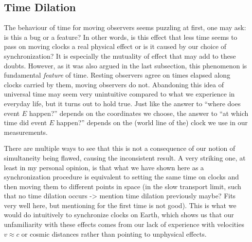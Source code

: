 


		\subsection{Time Dilation}
The behaviour of time for moving observers seems puzzling at first, one may ask: is this a bug or a feature? In other words, is this effect that less time seems to pass on moving clocks a real physical effect or is it caused by our choice of synchronization? It is especially the mutuality of effect that may add to these doubts. However, as it was also argued in the last subsection, this phenomenon is fundamental \emph{feature} of time. Resting observers agree on times elapsed along clocks carried by them, moving observers do not. Abandoning this idea of universal time may seem very unintuitive compared to what we experience in everyday life, but it turns out to hold true. Just like the answer to \enquote{where does event $E$ happen?} depends on the coordinates we choose, the answer to \enquote{at which time did event $E$ happen?} depends on the (world line of the) clock we use in our measurements.

There are multiple ways to see that this is not a consequence of our notion of simultaneity being flawed, causing the inconsistent result. A very striking one, at least in my personal opinion, is that what we have shown here as a synchronization procedure is equivalent to setting the same time on clocks and then moving them to different points in space (in the slow transport limit, such that no time dilation occurs -> mention time dilation previously maybe? Fits very well here, but mentioning for the first time is not good). This is what we would do intuitively to synchronize clocks on Earth, which shows us that our unfamiliarity with these effects comes from our lack of experience with velocities $v \approx c$ or cosmic distances rather than pointing to unphysical effects.


